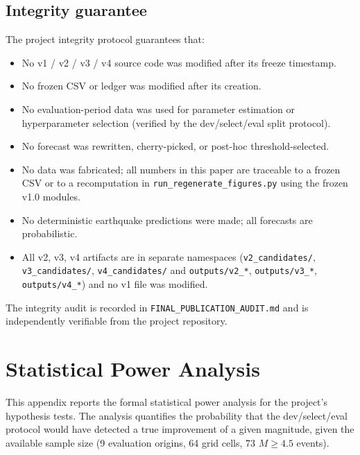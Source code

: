 \documentclass[10pt,a4paper,twocolumn]{article}
\begin{document}
\subsection{Integrity guarantee}

The project integrity protocol guarantees that:

\begin{itemize}[leftmargin=1.2em,itemsep=2pt,topsep=2pt]
\item No v1 / v2 / v3 / v4 source code was modified after its freeze timestamp.
\item No frozen CSV or ledger was modified after its creation.
\item No evaluation-period data was used for parameter estimation or hyperparameter selection (verified by the dev/select/eval split protocol).
\item No forecast was rewritten, cherry-picked, or post-hoc threshold-selected.
\item No data was fabricated; all numbers in this paper are traceable to a frozen CSV or to a recomputation in \texttt{run\_regenerate\_figures.py} using the frozen v1.0 modules.
\item No deterministic earthquake predictions were made; all forecasts are probabilistic.
\item All v2, v3, v4 artifacts are in separate namespaces (\texttt{v2\_candidates/}, \texttt{v3\_candidates/}, \texttt{v4\_candidates/} and \texttt{outputs/v2\_*}, \texttt{outputs/v3\_*}, \texttt{outputs/v4\_*}) and no v1 file was modified.
\end{itemize}

The integrity audit is recorded in \texttt{FINAL\_PUBLICATION\_AUDIT.md} and is independently verifiable from the project repository.

\section{Statistical Power Analysis}\label{app:power}

This appendix reports the formal statistical power analysis for the project's hypothesis tests. The analysis quantifies the probability that the dev/select/eval protocol would have detected a true improvement of a given magnitude, given the available sample size (9 evaluation origins, 64 grid cells, 73 $M\geq4.5$ events).
\end{document}
